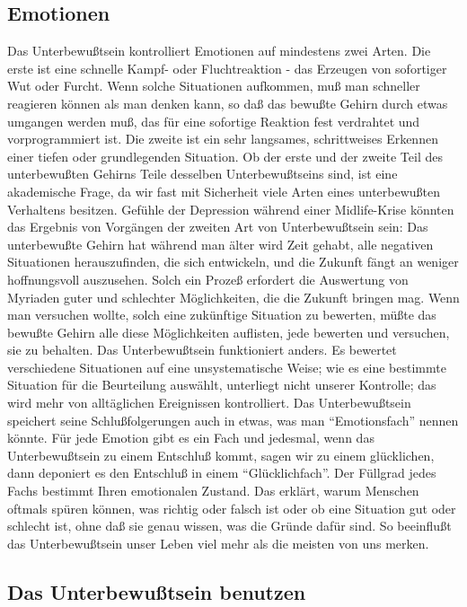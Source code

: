 \subsection{Emotionen}

Das Unterbewußtsein kontrolliert Emotionen auf mindestens zwei Arten.
 Die erste ist eine schnelle Kampf- oder Fluchtreaktion - das Erzeugen von sofortiger Wut oder Furcht.
 Wenn solche Situationen aufkommen, muß man schneller reagieren können als man denken kann, so daß das bewußte Gehirn durch etwas umgangen werden muß, das für eine sofortige Reaktion fest verdrahtet und vorprogrammiert ist.
 Die zweite ist ein sehr langsames, schrittweises Erkennen einer tiefen oder grundlegenden Situation.
 Ob der erste und der zweite Teil des unterbewußten Gehirns Teile desselben Unterbewußtseins sind, ist eine akademische Frage, da wir fast mit Sicherheit viele Arten eines unterbewußten Verhaltens besitzen.
 Gefühle der Depression während einer Midlife-Krise könnten das Ergebnis von Vorgängen der zweiten Art von Unterbewußtsein sein: Das unterbewußte Gehirn hat während man älter wird Zeit gehabt, alle negativen Situationen herauszufinden, die sich entwickeln, und die Zukunft fängt an weniger hoffnungsvoll auszusehen.
 Solch ein Prozeß erfordert die Auswertung von Myriaden guter und schlechter Möglichkeiten, die die Zukunft bringen mag.
 Wenn man versuchen wollte, solch eine zukünftige Situation zu bewerten, müßte das bewußte Gehirn alle diese Möglichkeiten auflisten, jede bewerten und versuchen, sie zu behalten.
 Das Unterbewußtsein funktioniert anders.
 Es bewertet verschiedene Situationen auf eine unsystematische Weise; wie es eine bestimmte Situation für die Beurteilung auswählt, unterliegt nicht unserer Kontrolle; das wird mehr von alltäglichen Ereignissen kontrolliert.
 Das Unterbewußtsein speichert seine Schlußfolgerungen auch in etwas, was man \enquote{Emotionsfach} nennen könnte.
 Für jede Emotion gibt es ein Fach und jedesmal, wenn das Unterbewußtsein zu einem Entschluß kommt, sagen wir zu einem glücklichen, dann deponiert es den Entschluß in einem \enquote{Glücklichfach}.
 Der Füllgrad jedes Fachs bestimmt Ihren emotionalen Zustand.
 Das erklärt, warum Menschen oftmals spüren können, was richtig oder falsch ist oder ob eine Situation gut oder schlecht ist, ohne daß sie genau wissen, was die Gründe dafür sind.
 So beeinflußt das Unterbewußtsein unser Leben viel mehr als die meisten von uns merken.
 \hypertarget{c3_6c}{}

\subsection{Das Unterbewußtsein benutzen}

